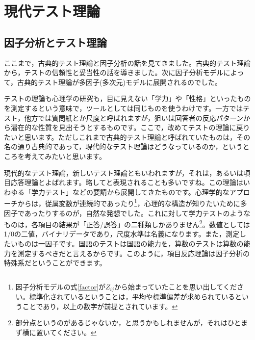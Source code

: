 \documentclass{ltjsbook}
\begin{document}
\chapter{現代テスト理論}
\label{x04_IRT}
\section{因子分析とテスト理論}
ここまで，古典的テスト理論と因子分析の話を見てきました。古典的テスト理論から，テストの信頼性と妥当性の話を導きました。次に因子分析モデルによって，古典的テスト理論が多因子(多次元)モデルに展開されるのでした。

テストの理論も心理学の研究も，目に見えない「学力」や「性格」といったものを測定するという意味で，ツールとしては同じものを使うわけです。一方ではテスト，他方では質問紙とか尺度と呼ばれますが，狙いは回答者の反応パターンから潜在的な性質を見出そうとするものです。ここで，改めてテストの理論に戻りたいと思います。ただしこれまで古典的テスト理論と呼ばれていたものは，その名の通り古典的であって，現代的なテスト理論はどうなっているのか，というところを考えてみたいと思います。

現代的なテスト理論，新しいテスト理論ともいわれますが，それは，あるいは項目応答理論とよばれます。略してと表現されることも多いですね。この理論はいわゆる「学力テスト」などの要請から展開してきたものです。心理学的なアプローチからは，従属変数が連続的であったり\footnote{因子分析モデルの式\ref{factor}が$Z_{ij}$から始まっていたことを思い出してください。標準化されているということは，平均や標準偏差が求められているということであり，以上の数字が前提とされています。}，心理的な構造が知りたいために多因子であったりするのが，自然な発想でした。これに対して学力テストのようなものは，各項目の結果が「正答/誤答」の二種類しかありません\footnote{部分点というのがあるじゃないか，と思うかもしれませんが，それはひとまず横に置いてください。}。数値としては1/0の二値，バイナリデータであり，尺度水準は名義になります。また，測定したいものは一因子です。国語のテストは国語の能力を，算数のテストは算数の能力を測定するべきだと言えるからです。このように，項目反応理論は因子分析の特殊系だということができます。

\end{document}
